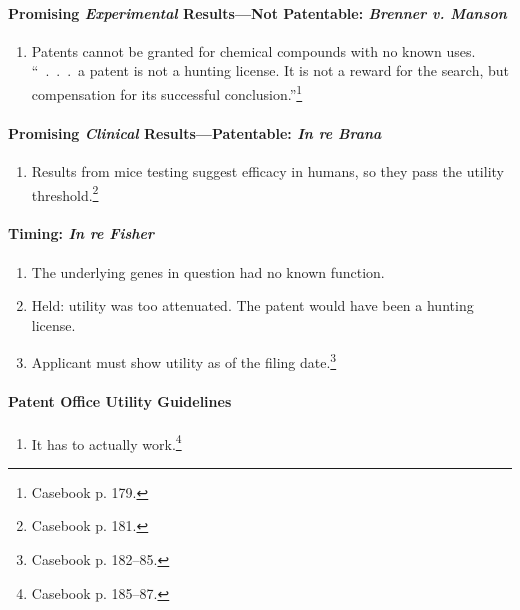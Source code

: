 \paragraph{Promising \emph{Experimental} Results---Not Patentable: 
\emph{Brenner v.  Manson}}

\begin{enumerate}
    \item Patents cannot be granted for chemical compounds with no known uses. 
    ``~.~.~.~a patent is not a hunting license. It is not a reward for the 
    search, but compensation for its successful 
    conclusion.''\footnote{Casebook p. 179.}
\end{enumerate}

\paragraph{Promising \emph{Clinical} Results---Patentable: \emph{In re Brana}}

\begin{enumerate}
    \item Results from mice testing suggest efficacy in humans, so they pass 
    the utility threshold.\footnote{Casebook p. 181.}
\end{enumerate}

\paragraph{Timing: \emph{In re Fisher}}

\begin{enumerate}
    \item The underlying genes in question had no known function.
    \item Held: utility was too attenuated. The patent would have been a 
    hunting license.
    \item Applicant must show utility as of the filing date.\footnote{Casebook 
    p. 182--85.}
\end{enumerate}

\paragraph{Patent Office Utility Guidelines}

\begin{enumerate}
    \item It has to actually work.\footnote{Casebook p. 185--87.}
\end{enumerate}

